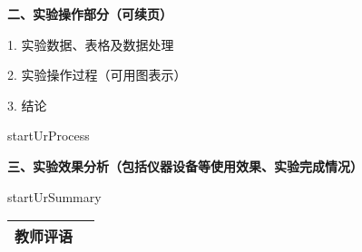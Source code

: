 \documentclass[12px]{article}
\begin{document}
\begin{center}
\begin{tabular}{|m{1.98cm}<{\centering}|m{3.25cm}<{\centering}|m{1.75cm}<{\centering}|m{3.27cm}<{\centering}|m{2.33cm}<{\centering}|m{2.35cm}<{\centering}m{0cm}|}
        \end{tabular}
    \end{center}


    \newpage
    \fancypage{\fbox}{}
    \textbf{二、实验操作部分（可续页）}

        1. 实验数据、表格及数据处理

        2. 实验操作过程（可用图表示）

        3. 结论

        startUrProcess


    \newpage
    \fancypage{\fbox}{}
    \textbf{三、实验效果分析（包括仪器设备等使用效果、实验完成情况）}

    startUrSummary
    \newpage
    \fancypage{}{}
    \begin{center}
        \begin{tabular}{|m{1em}|m{15.5cm}|}
            \hline
            教师评语 & \rule{0em}{21cm} \\
            \hline
        \end{tabular}
    \end{center}
\end{document}
